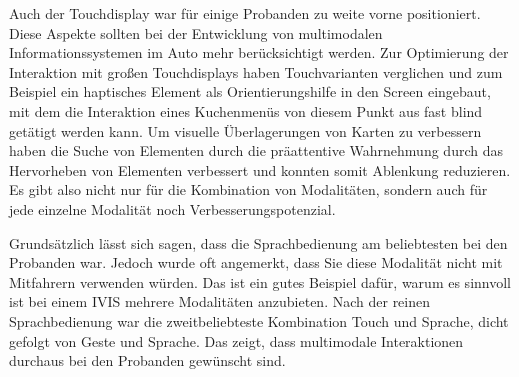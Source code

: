 Auch der Touchdisplay war für einige Probanden zu weite vorne positioniert. Diese Aspekte sollten bei der Entwicklung von multimodalen Informationssystemen im Auto mehr berücksichtigt werden. Zur Optimierung der Interaktion mit großen Touchdisplays haben \citet{Rumelin:2013} Touchvarianten verglichen und zum Beispiel ein haptisches Element als Orientierungshilfe in den Screen eingebaut, mit dem die Interaktion eines Kuchenmenüs von diesem Punkt aus fast blind getätigt werden kann. Um visuelle Überlagerungen von Karten zu verbessern haben \citet{lee2013saliency} die Suche von Elementen durch die präattentive Wahrnehmung durch das Hervorheben von Elementen verbessert und konnten somit Ablenkung reduzieren. Es gibt also nicht nur für die Kombination von Modalitäten, sondern auch für jede einzelne Modalität noch Verbesserungspotenzial. 

Grundsätzlich lässt sich sagen, dass die Sprachbedienung am beliebtesten bei den Probanden war. Jedoch wurde oft angemerkt, dass Sie diese Modalität nicht mit Mitfahrern verwenden würden. Das ist ein gutes Beispiel dafür, warum es sinnvoll ist bei einem IVIS mehrere Modalitäten anzubieten. Nach der reinen Sprachbedienung war die zweitbeliebteste Kombination Touch und Sprache, dicht gefolgt von Geste und Sprache. Das zeigt, dass multimodale Interaktionen durchaus bei den Probanden gewünscht sind. 